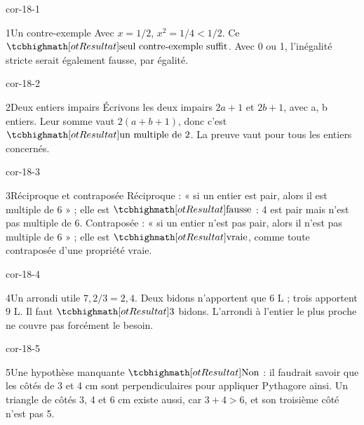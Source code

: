 \clearpage\pagestyle{otMain}\fontsize{11}{15}\selectfont{}
\begin{blocLivre}{cor-18-1}\begin{corrige}{1}{Un contre-exemple}
Avec $x=1/2$, $x^2=1/4<1/2$. Ce $\res{\text{seul contre-exemple suffit}}$. Avec 0 ou 1, l’inégalité stricte serait également fausse, par égalité.
\end{corrige}\end{blocLivre}
\begin{blocLivre}{cor-18-2}\begin{corrige}{2}{Deux entiers impairs}
Écrivons les deux impairs $2a+1$ et $2b+1$, avec a, b entiers. Leur somme vaut $2(a+b+1)$, donc c’est $\res{\text{un multiple de 2}}$. La preuve vaut pour tous les entiers concernés.
\end{corrige}\end{blocLivre}
\begin{blocLivre}{cor-18-3}\begin{corrige}{3}{Réciproque et contraposée}
Réciproque : « si un entier est pair, alors il est multiple de 6 » ; elle est $\res{\text{fausse}}$ : 4 est pair mais n’est pas multiple de 6. Contraposée : « si un entier n’est pas pair, alors il n’est pas multiple de 6 » ; elle est $\res{\text{vraie}}$, comme toute contraposée d’une propriété vraie.
\end{corrige}\end{blocLivre}
\begin{blocLivre}{cor-18-4}\begin{corrige}{4}{Un arrondi utile}
$7{,}2/3=2{,}4$. Deux bidons n’apportent que 6 L ; trois apportent 9 L. Il faut $\res3$ bidons. L’arrondi à l’entier le plus proche ne couvre pas forcément le besoin.
\end{corrige}\end{blocLivre}
\begin{blocLivre}{cor-18-5}\begin{corrige}{5}{Une hypothèse manquante}
$\res{\text{Non}}$ : il faudrait savoir que les côtés de 3 et 4 cm sont perpendiculaires pour appliquer Pythagore ainsi. Un triangle de côtés 3, 4 et 6 cm existe aussi, car $3+4>6$, et son troisième côté n’est pas 5.
\end{corrige}\end{blocLivre}
